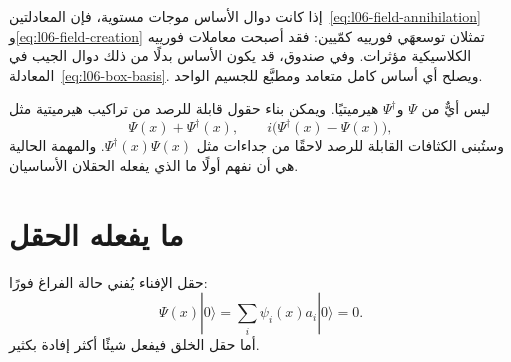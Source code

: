 إذا كانت دوال الأساس موجات مستوية، فإن المعادلتين~\eqref{eq:l06-field-annihilation} و\eqref{eq:l06-field-creation} تمثلان توسعهَي فورييه كمّيين: فقد أصبحت معاملات فورييه الكلاسيكية مؤثرات. وفي صندوق، قد يكون الأساس بدلًا من ذلك دوال الجيب في المعادلة~\eqref{eq:l06-box-basis}. ويصلح أي أساس كامل متعامد ومطبَّع للجسيم الواحد.

ليس أيٌّ من \(\Psi\) و\(\Psi^\dagger\) هيرميتيًا. ويمكن بناء حقول قابلة للرصد من تراكيب هيرميتية مثل
\begin{equation}
\Psi(x)+\Psi^\dagger(x),
\qquad
i\bigl(\Psi^\dagger(x)-\Psi(x)\bigr),
\end{equation}
وستُبنى الكثافات القابلة للرصد لاحقًا من جداءات مثل \(\Psi^\dagger(x)\Psi(x)\). والمهمة الحالية هي أن نفهم أولًا ما الذي يفعله الحقلان الأساسيان.

\begin{classroomqa}
\end{classroomqa}

\section{ما يفعله الحقل}

حقل الإفناء يُفني حالة الفراغ فورًا:
\begin{equation}
\Psi(x)|0\rangle
=\sum_i\psi_i(x)a_i|0\rangle
=0.
\label{eq:l06-field-kills-vacuum}
\end{equation}
أما حقل الخلق فيفعل شيئًا أكثر إفادة بكثير.

